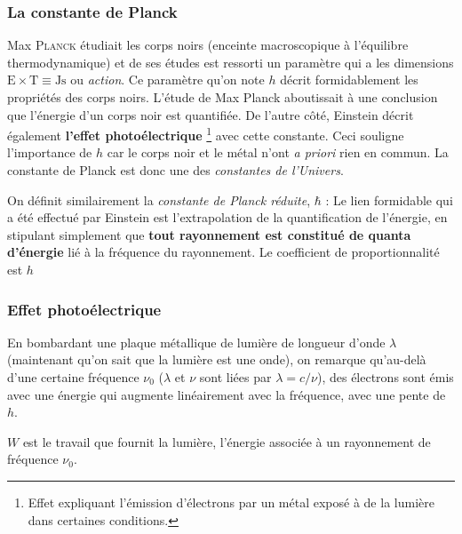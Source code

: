 \documentclass[11pt]{book}
\begin{document}
\subsubsection{La constante de Planck}
Max \textsc{Planck} étudiait les corps noirs (enceinte macroscopique à l'équilibre thermodynamique) et de ses études est ressorti un paramètre qui a les dimensions $\mathrm{E} \times \mathrm{T} \equiv \mathrm{Js}$ ou \textit{action}. Ce paramètre qu'on note $h$ décrit formidablement les propriétés des corps noirs. L'étude de Max Planck aboutissait à une conclusion que l'énergie d'un corps noir est quantifiée. De l'autre côté, Einstein décrit également \textbf{l'effet photoélectrique} \footnote{Effet expliquant l'émission d'électrons par un métal exposé à de la lumière dans certaines conditions.} avec cette constante. Ceci souligne l'importance de $h$ car le corps noir et le métal n'ont \textit{a priori} rien en commun. La constante de Planck est donc une des \textit{constantes de l'Univers}.

On définit similairement la \textit{constante de Planck réduite}, $\hbar$ :
 Le lien formidable qui a été effectué par Einstein est l'extrapolation de la quantification de l'énergie, en stipulant simplement que \textbf{tout rayonnement est constitué de quanta d'énergie} lié à la fréquence du rayonnement. Le coefficient de proportionnalité est $h$
\subsubsection{Effet photoélectrique}
En bombardant une plaque métallique de lumière de longueur d'onde $\lambda$ (maintenant qu'on sait que la lumière est une onde), on remarque qu'au-delà d'une certaine fréquence $\nu_0$ ($\lambda$ et $\nu$ sont liées par $\lambda = c/\nu$), des électrons sont émis avec une énergie qui augmente linéairement avec la fréquence, avec une pente de $h$.

$W$ est le travail que fournit la lumière, l'énergie associée à un rayonnement de fréquence $\nu_0$.
\end{document}
